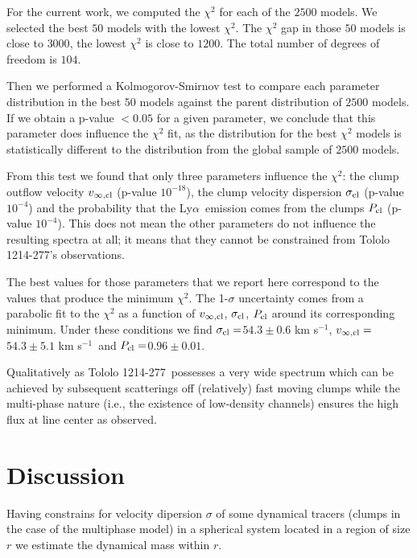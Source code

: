 \documentclass[a4,useAMS,usenatbib,usegraphicx]{mn2e}
\newcommand{\tol}{Tololo 1214-277}
\newcommand{\lya}{Ly$\alpha$}
\newcommand{\sigmaclump}{$54.3\pm 0.6$ km s$^{-1}$}
\newcommand{\inftyclump}{$54.3\pm 5.1$ km s$^{-1}$}
\newcommand{\probaclump}{$0.96\pm 0.01$}
\begin{document}
 For the current work, we computed the $\chi^2$ for each of the $2500$
models. We selected the best $50$ models with the lowest $\chi^2$. The
$\chi^2$ gap in those $50$ models is close to $3000$, the lowest
$\chi^2$ is close to $1200$. The total number of degrees of freedom is
$104$.    

Then we performed a Kolmogorov-Smirnov test to compare each parameter
distribution in the best $50$ models against the parent distribution
of $2500$ models. 
If we obtain a p-value $<0.05$ for a given parameter, we conclude that
this parameter does influence the $\chi^2$ fit, as the distribution for
the best $\chi^2$ models is statistically different to the
distribution from the global sample of $2500$ models.  

From this test we found that only three parameters influence the
$\chi^2$: the clump outflow velocity $v_{\infty,\rm{cl}}$ (p-value 
$10^{-18}$), the clump velocity dispersion $\sigma_{\rm cl}$ (p-value
$10^{-4}$) and the probability that the \lya\ emission comes from the
clumps $P_{\rm cl}$ (p-value $10^{-4}$). This does not mean the other
parameters do not influence the resulting spectra at all; it means
that they cannot be constrained from \tol's observations. 

The best values for those parameters that we report here correspond to
the values that produce the minimum
$\chi^2$. The 1-$\sigma$ uncertainty comes from a parabolic fit to the
$\chi^2$ as a function of $v_{\infty,\rm{cl}}$, $\sigma_{\rm cl}$,
$P_{\rm cl}$ around its corresponding minimum.
Under these conditions we find $\sigma_{\rm cl}=$\sigmaclump,
$v_{\infty {\rm, cl}}=$\inftyclump\ and $P_{\rm cl}=$\probaclump. 

Qualitatively as \tol\ possesses a very wide spectrum which can be
achieved by subsequent scatterings off (relatively) fast moving clumps
while the multi-phase nature (i.e., the existence of low-density
channels) ensures the high flux at line center as observed.     








\section{Discussion}

Having constrains for  velocity dipersion $\sigma$ of some dynamical
tracers (clumps in the case of the multiphase model) in a spherical
system located in a region of size $r$ we estimate the dynamical mass
within $r$. 
\end{document}
